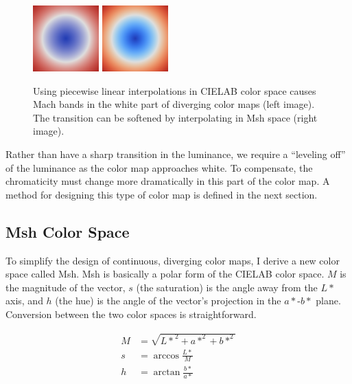 \documentclass{acmsiggraph}               %
\newcommand{\Lab}{CIELAB\xspace}
\newcommand{\Msh}{Msh\xspace}
\begin{document}
\begin{figure}
  \centering
  \includegraphics[width=1in]{images/Cool2WarmLabRadial}
  \qquad
  \includegraphics[width=1in]{images/Cool2WarmRadial}
  \caption{Using piecewise linear interpolations in \Lab color space causes
    Mach bands in the white part of diverging color maps (left image).  The
    transition can be softened by interpolating in \Msh space (right image).}
  \label{fig:LinearMachBands}
\end{figure}

Rather than have a sharp transition in the luminance, we require a
``leveling off'' of the luminance as the color map approaches white.  To
compensate, the chromaticity must change more dramatically in this part of
the color map.  A method for designing this type of color map is defined in
the next section.

\subsection{\Msh Color Space}
\label{sec:MshColorSpace}

To simplify the design of continuous, diverging color maps, I derive a new
color space called \Msh.  \Msh is basically a polar form of the \Lab color
space.  $M$ is the magnitude of the vector, $s$ (the saturation) is the
angle away from the $L*$ axis, and $h$ (the hue) is the angle of the
vector's projection in the $a*$-$b*$ plane.  Conversion between the two
color spaces is straightforward.

\begin{equation}
  \begin{split}
    M &= \sqrt{{L*}^2 + a*^2 + b*^2} \\
    s &= \arccos \frac{L*}{M} \\
    h &= \arctan \frac{b*}{a*}
  \end{split}
  \label{eqn:LabToMsh}
\end{equation}
\end{document}
